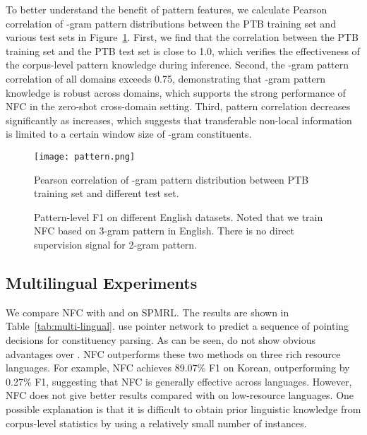 \documentclass[11pt]{article}
\begin{document}
To better understand the benefit of pattern features, we calculate Pearson correlation of -gram pattern distributions between the PTB training set and various test sets in Figure~\ref{fig:correlation}.
First, we find that the correlation between the PTB training set and the PTB test set is close to 1.0, which verifies the effectiveness of the corpus-level pattern knowledge during inference. 
Second, the -gram pattern correlation of all domains exceeds 0.75, demonstrating that -gram pattern knowledge is robust across domains, which supports the strong performance of NFC in the zero-shot cross-domain setting. 
Third, pattern correlation decreases significantly as  increases, which suggests that transferable non-local information is limited to a certain window size of -gram constituents. 




\begin{figure}[t!]
    \centering
    \texttt{[image: pattern.png]}
    \caption{Pearson correlation of -gram pattern distribution between PTB training set and different test set.}
    \label{fig:correlation}
\end{figure}

\begin{figure}[t!]
    \centering
    \caption{Pattern-level F1 on different English datasets. Noted that we train NFC based on 3-gram pattern in English. There is no direct supervision signal for 2-gram pattern.}
    \label{fig:pattern}
\end{figure}






\subsection{Multilingual Experiments}
We compare NFC with \citet{san-constituency} and \citet{constituency-point} on SPMRL. 
The results are shown in Table~\ref{tab:multi-lingual}. 
\citet{constituency-point} use pointer network to predict a sequence of pointing decisions for constituency parsing. As can be seen, \citet{constituency-point} do not show obvious advantages over \citet{san-constituency}.
NFC outperforms these two methods on three rich resource languages. 
For example, NFC achieves 89.07\% F1 on Korean, outperforming \citet{san-constituency} by 0.27\% F1, suggesting that NFC is generally effective across languages. However, NFC does not give better results compared with \citet{san-constituency} on low-resource languages. 
One possible explanation is that it is difficult to obtain prior linguistic knowledge from corpus-level statistics by using a relatively small number of instances.
\end{document}
